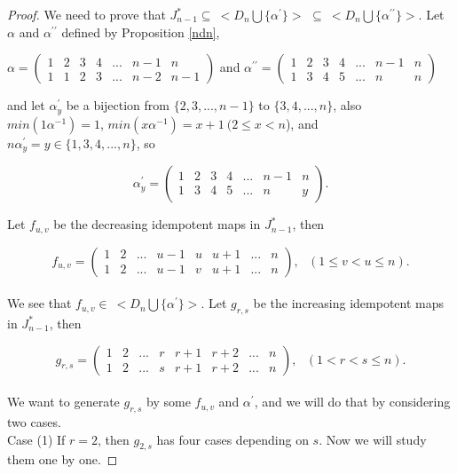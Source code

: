 \documentclass[10pt]{extarticle}
\numberwithin{equation}{section}
\numberwithin{bbb}{section}
\numberwithin{equation}{section}
\begin{document}
\begin{proof}
  We need to prove that $J^*_{n-1}
  \subseteq \ <D_n \bigcup \{\alpha^\prime\}>$ $\subseteq \ <D_n \bigcup \{\alpha^{\prime\prime}\}>$. 
Let $\alpha$ and $\alpha^{\prime\prime}$ defined by Proposition \ref{ndn},

\vspace{0.2cm}
\begin{center}
$\alpha=
\begin{pmatrix}  
1&2&3&4&...&n-1&n\\1&1&2&3&...&n-2&n-1
\end{pmatrix}$ and
$\alpha^{\prime\prime}=
\begin{pmatrix}  
1&2&3&4&...&n-1&n\\1&3&4&5&...&n&n
\end{pmatrix}$\\[10pt]
\end{center}
and let $\alpha^{\prime}_y$ be a bijection from $\{2,3,...,n-1\}$ to $\{3,4,...,n\}$, also $min(1\alpha^{-1})=1$, $min(x\alpha^{-1})=x+1 \ (2\leq x <n$), and \ $n\alpha^{\prime}_y=y\in \{1,3,4,...,n\}$, so

\vspace{0.3cm}
$$\alpha^{\prime}_y=
\begin{pmatrix}  
1&2&3&4&...&n-1&n\\1&3&4&5&...&n&y
\end{pmatrix}.$$

\vspace{0.5cm}
Let $f_{u,v}$ be the decreasing idempotent maps in $J^*_{n-1}$, then

\vspace{0.2cm}
$$f_{u,v}=
\begin{pmatrix}  
1&2&...&u-1&u&u+1&...&n\\1&2&...&u-1&v&u+1&...&n
\end{pmatrix}, \ \ \ (1\leq v <u \leq n).$$\\[10pt]
We see that $f_{u,v} \in \ <D_n \bigcup \{\alpha^\prime\}>$. Let $g_{r,s}$ be the increasing idempotent maps in $J^*_{n-1}$, then

\vspace{0.2cm}
$$g_{r,s}=
\begin{pmatrix}  
1&2&...&r&r+1&r+2&...&n\\1&2&...&s&r+1&r+2&...&n
\end{pmatrix}, \ \ \ (1<r<s \leq n).$$\\[10pt]
We want to generate $g_{r,s}$ by some $f_{u,v}$ and $\alpha^{\prime}$,
and we will do that by considering two cases.\\[10pt]
Case (1) If $r=2$, then $g_{2,s}$ has four cases depending on $s$. Now we will study them one by one.


\end{proof}
\end{document}
